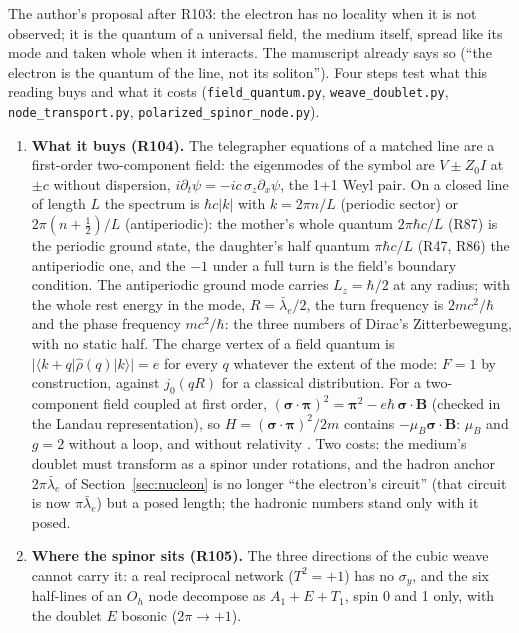 \documentclass[11pt,a4paper]{article}
\theoremstyle{plain}
\theoremstyle{remark}
\newcommand{\lb}{\ensuremath{\bar\lambda_e}}
\begin{document}
The author's proposal after R103: the electron has no locality when it is not observed; it is the
quantum of a universal field, the medium itself, spread like its mode and taken whole when it
interacts. The manuscript already says so (``the electron is the quantum of the line, not its
soliton''). Four steps test what this reading buys and what it costs
(\texttt{field\_quantum.py}, \texttt{weave\_doublet.py}, \texttt{node\_transport.py},
\texttt{polarized\_spinor\_node.py}).

\begin{enumerate}[nosep]
\item \textbf{What it buys (R104).} The telegrapher equations of a matched line are a first-order
two-component field: the eigenmodes of the symbol are $V \pm Z_0 I$ at $\pm c$ without dispersion,
$i\partial_t\psi = -ic\,\sigma_z\partial_x\psi$, the 1+1 Weyl pair. On a closed line of length
$L$ the spectrum is $\hbar c|k|$ with $k = 2\pi n/L$ (periodic sector) or $2\pi(n+\tfrac12)/L$
(antiperiodic): the mother's whole quantum $2\pi\hbar c/L$ (R87) is the periodic ground state, the
daughter's half quantum $\pi\hbar c/L$ (R47, R86) the antiperiodic one, and the $-1$ under a full
turn is the field's boundary condition. The antiperiodic ground mode carries $L_z = \hbar/2$ at
any radius; with the whole rest energy in the mode, $R = \lb/2$, the turn frequency is
$2mc^2/\hbar$ and the phase frequency $mc^2/\hbar$: the three numbers of Dirac's Zitterbewegung,
with no static half. The charge vertex of a field quantum is $|\langle k+q|\hat\rho(q)|k\rangle| = e$
for every $q$ whatever the extent of the mode: $F = 1$ by construction, against $j_0(qR)$ for a
classical distribution. For a two-component field coupled at first order,
$(\boldsymbol\sigma\cdot\boldsymbol\pi)^2 = \boldsymbol\pi^2 - e\hbar\,\boldsymbol\sigma\cdot\mathbf B$
(checked in the Landau representation), so $H = (\boldsymbol\sigma\cdot\boldsymbol\pi)^2/2m$
contains $-\mu_B\boldsymbol\sigma\cdot\mathbf B$: $\mu_B$ and $g = 2$ without a loop, and without
relativity \cite{levyleblond}. Two costs: the medium's doublet must transform as a spinor under
rotations, and the hadron anchor $2\pi\lb$ of Section~\ref{sec:nucleon} is no longer ``the
electron's circuit'' (that circuit is now $\pi\lb$) but a posed length; the hadronic numbers stand
only with it posed.
\item \textbf{Where the spinor sits (R105).} The three directions of the cubic weave cannot carry
it: a real reciprocal network ($T^2 = +1$) has no $\sigma_y$, and the six half-lines of an $O_h$
node decompose as $A_1 + E + T_1$, spin 0 and 1 only, with the doublet $E$ bosonic ($2\pi \to +1$).

\end{enumerate}
\end{document}

